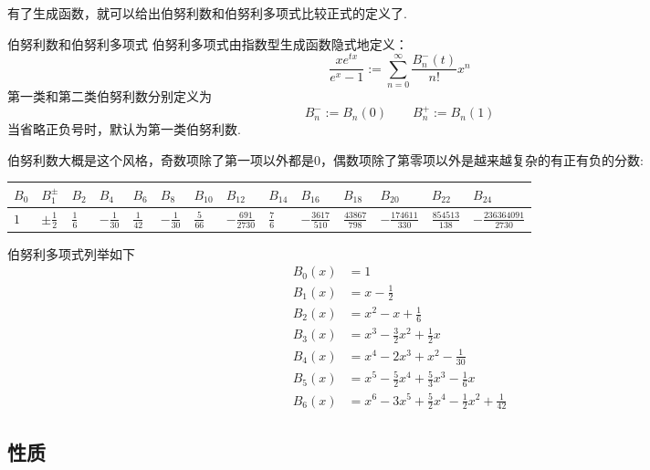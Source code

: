 \documentclass[main.tex]{subfiles}
\begin{document}
有了生成函数，就可以给出伯努利数和伯努利多项式比较正式的定义了.
\begin{definition}{伯努利数和伯努利多项式}
    伯努利多项式由指数型生成函数隐式地定义：
    \[ \frac{xe^{tx}}{e^{x}-1} := \sum_{n=0}^{\infty}\frac{B_n^-(t)}{n!}x^n \]
    第一类和第二类伯努利数分别定义为
    \[B_n^-:= B_n(0) \qquad B_n^+ := B_n(1)\]
    当省略正负号时，默认为第一类伯努利数.
\end{definition}

伯努利数大概是这个风格，奇数项除了第一项以外都是0，偶数项除了第零项以外是越来越复杂的有正有负的分数:
\newline
\begin{tabular}{|l|l|l|l|l|l|l|l|l|l|l|l|l|l|}
    \hline
    \(B_{0}\) & \(B_{1}^{\pm}\) & \(B_{2}\) & \(B_{4}\) & \(B_{6}\) & \(B_{8}\) & \(B_{10}\) & \(B_{12}\) & \(B_{14}\) & \(B_{16}\) & \(B_{18}\) & \(B_{20}\) & \(B_{22}\)  & \(B_{24}\) \\
    \hline
    \(1\) & \(\pm\frac{1}{2}\) & \(\frac{1}{6}\) & \(-\frac{1}{30}\) & \(\frac{1}{42}\) & \(-\frac{1}{30}\) & \(\frac{5}{66}\) & \(-\frac{691}{2730}\) & \(\frac{7}{6}\) & \(-\frac{3617}{510}\) & \(\frac{43867}{798}\) & \(-\frac{174611}{330}\) & \(\frac{854513}{138}\) & \(-\frac{236364091}{2730}\)\\
    \hline
\end{tabular}
\newline
\vspace{0.5cm}
伯努利多项式列举如下
\begin{align*}
    B_0(x) &= 1 \\
    B_1(x) &= x - \frac{1}{2} \\
    B_2(x) &= x^2 - x + \frac{1}{6} \\
    B_3(x) &= x^3 - \frac{3}{2}x^2 + \frac{1}{2}x  \\
    B_4(x) &= x^4 - 2x^3 + x^2  - \frac{1}{30} \\
    B_5(x) &= x^5 - \frac{5}{2}x^4 + \frac{5}{3}x^3 - \frac{1}{6}x \\
    B_6(x) &= x^6 - 3x^5 + \frac{5}{2}x^4 - \frac{1}{2}x^2 + \frac{1}{42}
\end{align*}

\subsection{性质}
\end{document}
